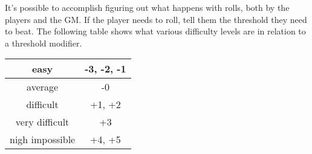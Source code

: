 \begin{flushleft}
It's possible to accomplish figuring out what happens with rolls, both by the
players and the GM. If the player needs to roll, tell them the threshold they
need to beat. The following table shows what various difficulty levels are
in relation to a threshold modifier.

\begin{center}
\begin{tabular}{ |c|c|}
\hline
easy & -3, -2, -1 \\
\hline
average & -0 \\
\hline
difficult & +1, +2 \\
\hline
very difficult & +3 \\
\hline
nigh impossible & +4, +5 \\
\hline
\end{tabular}
\end{center}

\end{flushleft}
